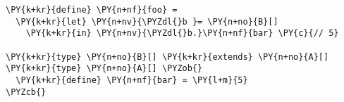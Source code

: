 \begin{Verbatim}[commandchars=\\\{\}]
\PY{k+kr}{define} \PY{n+nf}{foo} =
  \PY{k+kr}{let} \PY{n+nv}{\PYZdl{}b }= \PY{n+no}{B}[]
    \PY{k+kr}{in} \PY{n+nv}{\PYZdl{}b.}\PY{n+nf}{bar} \PY{c}{// 5}

\PY{k+kr}{type} \PY{n+no}{B}[] \PY{k+kr}{extends} \PY{n+no}{A}[]
\PY{k+kr}{type} \PY{n+no}{A}[] \PYZob{}
  \PY{k+kr}{define} \PY{n+nf}{bar} = \PY{l+m}{5}
\PYZcb{}
\end{Verbatim}
